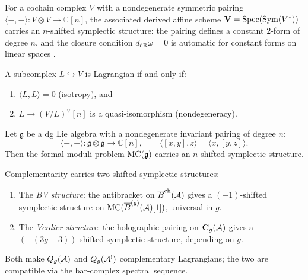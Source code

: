 \begin{example}
\label{ex:thqg-III-linear-shifted}
For a cochain complex $V$ with a nondegenerate symmetric pairing
$\langle -, - \rangle \colon V \otimes V \to \mathbb{C}[n]$,
the associated derived affine scheme
$\mathbf{V} = \operatorname{Spec}(\operatorname{Sym}(V^*))$ carries an $n$-shifted
symplectic structure: the pairing defines a constant $2$-form
of degree $n$, and the closure condition
$d_{\mathrm{dR}}\omega = 0$ is automatic for constant forms
on linear spaces \cite[Example~1.4]{PTVV13}.

A subcomplex $L \hookrightarrow V$ is Lagrangian if and only
if:
\begin{enumerate}[label=\textup{(\alph*)}]
\item $\langle L, L \rangle = 0$ (isotropy), and
\item $L \to (V/L)^{\vee}[n]$ is a quasi-isomorphism
 (nondegeneracy).
\end{enumerate}
\end{example}

\begin{proposition}
\label{prop:thqg-III-kontsevich-pridham}
Let $\mathfrak{g}$ be a dg Lie algebra with a nondegenerate
invariant pairing of degree $n$:
\[
\langle -, - \rangle
\colon \mathfrak{g} \otimes \mathfrak{g}
\to \mathbb{C}[n],
\qquad
\langle [x,y], z \rangle
= \langle x, [y,z] \rangle.
\]
Then the formal moduli problem
$\mathrm{MC}(\mathfrak{g})$ carries an $n$-shifted symplectic structure.
\end{proposition}

\begin{remark}
\label{rem:thqg-III-two-structures}
Complementarity carries two shifted symplectic structures:
\begin{enumerate}[label=\textup{(\roman*)}]
\item The \emph{BV structure}: the antibracket on
 $\overline{B}^{\mathrm{ch}}(\mathcal{A})$ gives a $(-1)$-shifted symplectic
 structure on $\mathrm{MC}(\overline{B}^{(g)}(\mathcal{A})[1])$, universal in $g$.
\item The \emph{Verdier structure}: the holographic pairing on
 $\mathbf{C}_g(\mathcal{A})$ gives a $(-(3g-3))$-shifted symplectic
 structure, depending on $g$.
\end{enumerate}
Both make $Q_g(\mathcal{A})$ and $Q_g(\mathcal{A}^!)$ complementary Lagrangians;
the two are compatible via the bar-complex spectral sequence.
\end{remark}

